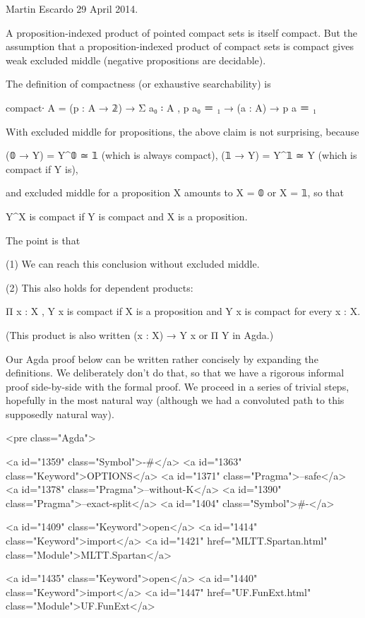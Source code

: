 Martin Escardo 29 April 2014.

A proposition-indexed product of pointed compact sets is itself
compact. But the assumption that a proposition-indexed product of
compact sets is compact gives weak excluded middle (negative
propositions are decidable).

The definition of compactness (or exhaustive searchability) is

    compact∙ A = (p : A → 𝟚) → Σ a₀ ꞉ A , p a₀ ＝ ₁ → (a : A) → p a ＝ ₁

With excluded middle for propositions, the above claim is not
surprising, because

    (𝟘 → Y) = Y^𝟘 ≃ 𝟙 (which is always compact),
    (𝟙 → Y) = Y^𝟙 ≃ Y (which is compact if Y is),

and excluded middle for a proposition X amounts to X = 𝟘 or X = 𝟙, so
that

    Y^X is compact if Y is compact and X is a proposition.

The point is that

    (1) We can reach this conclusion without excluded middle.

    (2) This also holds for dependent products:

        Π x : X , Y x is compact if X is a proposition and Y x is
        compact for every x : X.

        (This product is also written (x : X) → Y x or Π Y in Agda.)

Our Agda proof below can be written rather concisely by expanding the
definitions. We deliberately don't do that, so that we have a rigorous
informal proof side-by-side with the formal proof. We proceed in a
series of trivial steps, hopefully in the most natural way (although
we had a convoluted path to this supposedly natural way).

<pre class="Agda">

<a id="1359" class="Symbol">{-#</a> <a id="1363" class="Keyword">OPTIONS</a> <a id="1371" class="Pragma">--safe</a> <a id="1378" class="Pragma">--without-K</a> <a id="1390" class="Pragma">--exact-split</a> <a id="1404" class="Symbol">#-}</a>

<a id="1409" class="Keyword">open</a> <a id="1414" class="Keyword">import</a> <a id="1421" href="MLTT.Spartan.html" class="Module">MLTT.Spartan</a>

<a id="1435" class="Keyword">open</a> <a id="1440" class="Keyword">import</a> <a id="1447" href="UF.FunExt.html" class="Module">UF.FunExt</a>


